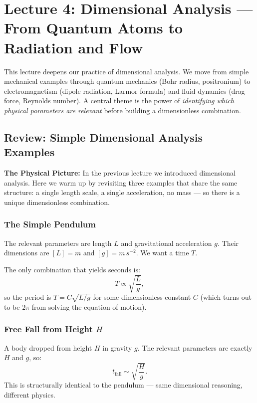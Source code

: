 \section{Lecture 4: Dimensional Analysis — From Quantum Atoms to Radiation and Flow}
\date{30/04/2026}

This lecture deepens our practice of dimensional analysis. We move from simple
mechanical examples through quantum mechanics (Bohr radius, positronium) to
electromagnetism (dipole radiation, Larmor formula) and fluid dynamics (drag
force, Reynolds number). A central theme is the power of \emph{identifying
which physical parameters are relevant} before building a dimensionless
combination.

\subsection{Review: Simple Dimensional Analysis Examples}

\textbf{The Physical Picture:}
In the previous lecture we introduced dimensional analysis. Here we warm up by
revisiting three examples that share the same structure: a single length scale,
a single acceleration, no mass — so there is a unique dimensionless combination.

\subsubsection*{The Simple Pendulum}
The relevant parameters are length $L$ and gravitational acceleration $g$.
Their dimensions are $[L] = \si{m}$ and $[g] = \si{m\,s^{-2}}$.  We want a
time $T$.

The only combination that yields seconds is:
\[
    T \propto \sqrt{\frac{L}{g}},
\]
so the period is $T = C\sqrt{L/g}$ for some dimensionless constant $C$ (which
turns out to be $2\pi$ from solving the equation of motion).

\subsubsection*{Free Fall from Height $H$}
A body dropped from height $H$ in gravity $g$. The relevant parameters are
exactly $H$ and $g$, so:
\[
    t_\text{fall} \sim \sqrt{\frac{H}{g}}.
\]
This is structurally identical to the pendulum — same dimensional reasoning, different physics.

